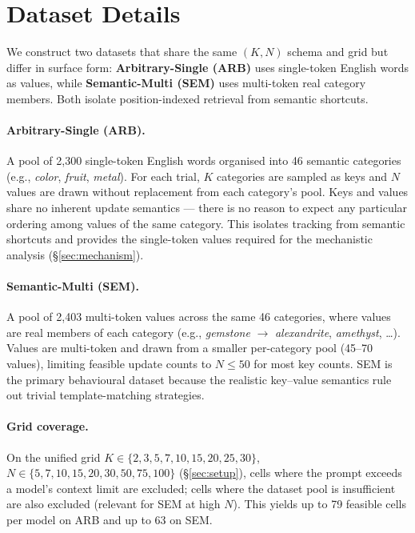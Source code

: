 \documentclass[11pt]{article}
\begin{document}
\section{Dataset Details}
\label{app:datasets}

We construct two datasets that share the same $(K, N)$ schema and
grid but differ in surface form: \textbf{Arbitrary-Single (ARB)} uses
single-token English words as values, while \textbf{Semantic-Multi
(SEM)} uses multi-token real category members. Both isolate
position-indexed retrieval from semantic shortcuts.

\paragraph{Arbitrary-Single (ARB).}
A pool of 2{,}300 single-token English words organised into 46
semantic categories (e.g., \textit{color}, \textit{fruit},
\textit{metal}).
For each trial, $K$ categories are sampled as keys and $N$ values are
drawn without replacement from each category's pool.
Keys and values share no inherent update semantics --- there is no
reason to expect any particular ordering among values of the same
category.
This isolates tracking from semantic shortcuts and provides the
single-token values required for the mechanistic analysis
(\S\ref{sec:mechanism}).

\paragraph{Semantic-Multi (SEM).}
A pool of 2{,}403 multi-token values across the same 46 categories,
where values are real members of each category (e.g., \textit{gemstone}
$\rightarrow$ \textit{alexandrite}, \textit{amethyst}, \ldots).
Values are multi-token and drawn from a smaller per-category pool
(45--70 values), limiting feasible update counts to $N \leq 50$ for
most key counts.
SEM is the primary behavioural dataset because the realistic
key--value semantics rule out trivial template-matching strategies.

\paragraph{Grid coverage.}
On the unified grid $K \in \{2, 3, 5, 7, 10, 15, 20, 25, 30\}$,
$N \in \{5, 7, 10, 15, 20, 30, 50, 75, 100\}$ (\S\ref{sec:setup}),
cells where the prompt exceeds a model's context limit are excluded;
cells where the dataset pool is insufficient are also excluded
(relevant for SEM at high $N$).
This yields up to 79 feasible cells per model on ARB and up to 63
on SEM.
\end{document}
